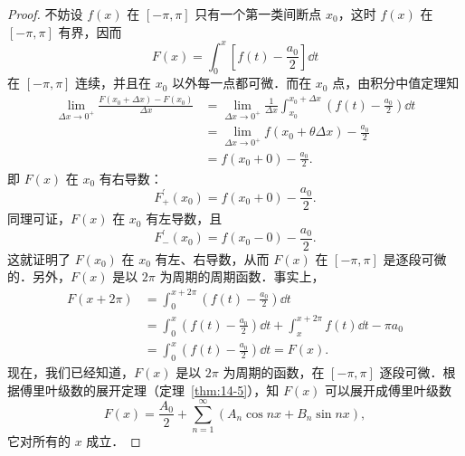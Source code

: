 \begin{proof}
不妨设 $f(x)$ 在 $[-\pi,\pi]$ 只有一个第一类间断点 $x_{0}$，这时 $f(x)$ 在 $[-\pi,\pi]$ 有界，因而
\[
F(x)=\int_{0}^{x}\left[f(t)-\frac{a_{0}}{2}\right]\dd t
\]
在 $[-\pi,\pi]$ 连续，并且在 $x_{0}$ 以外每一点都可微．而在 $x_{0}$ 点，由积分中值定理知
\[
\begin{aligned}
\lim_{\Delta x\to 0^{+}}\frac{F(x_{0}+\Delta x)-F(x_{0})}{\Delta x}&=\lim_{\Delta x\to 0^{+}}\frac{1}{\Delta x}\int_{x_{0}}^{x_{0}+\Delta x}\left(f(t)-\frac{a_{0}}{2}\right)\dd t\\
&=\lim_{\Delta x\to 0^{+}}f(x_{0}+\theta\Delta x)-\frac{a_{0}}{2}\\
&=f(x_{0}+0)-\frac{a_{0}}{2}.
\end{aligned}
\]
即 $F(x)$ 在 $x_{0}$ 有右导数：
\[
F_{+}^{\prime}(x_{0})=f(x_{0}+0)-\frac{a_{0}}{2}.
\]
同理可证，$F(x)$ 在 $x_{0}$ 有左导数，且
\[
F_{-}^{\prime}(x_{0})=f(x_{0}-0)-\frac{a_{0}}{2}.
\]
这就证明了 $F(x_{0})$ 在 $x_{0}$ 有左、右导数，从而 $F(x)$ 在 $[-\pi,\pi]$ 是逐段可微的．另外，$F(x)$ 是以 $2\pi$ 为周期的周期函数．事实上，
\[
\begin{aligned}
F(x+2\pi)&=\int_{0}^{x+2\pi}\left(f(t)-\frac{a_{0}}{2}\right)\dd t\\
&=\int_{0}^{x}\left(f(t)-\frac{a_{0}}{2}\right)\dd t+\int_{x}^{x+2\pi}f(t)\dd t-\pi a_{0}\\
&=\int_{0}^{x}\left(f(t)-\frac{a_{0}}{2}\right)\dd t=F(x).
\end{aligned}
\]
现在，我们已经知道，$F(x)$ 是以 $2\pi$ 为周期的函数，在 $[-\pi,\pi]$ 逐段可微．根据傅里叶级数的展开定理（定理~\ref{thm:14-5}），知 $F(x)$ 可以展开成傅里叶级数
\[
F(x)=\frac{A_{0}}{2}+\sum_{n=1}^{\infty}\left(A_{n}\cos nx+B_{n}\sin nx\right),
\]
它对所有的 $x$ 成立．


\end{proof}
